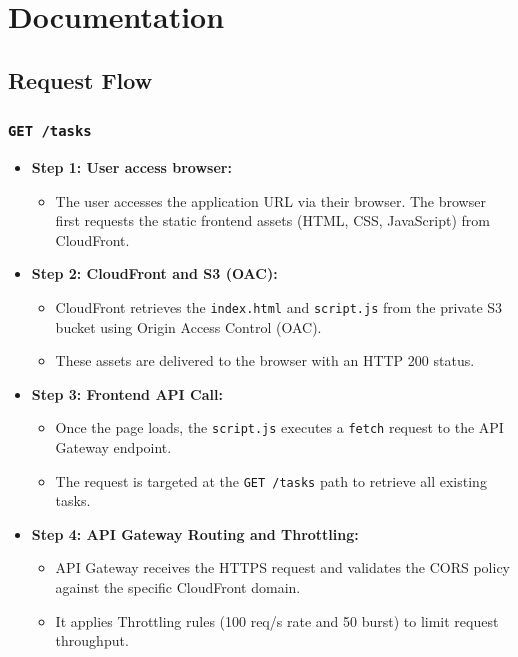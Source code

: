 \chapter{Documentation}

\section{Request Flow}

\subsection{\texttt{GET /tasks}}
\begin{itemize}
  \item \textbf{Step 1: User access browser:}
  \begin{itemize}
  \item The user accesses the application URL via their browser. The browser first requests the static frontend assets (HTML, CSS, JavaScript) from CloudFront.
  \end{itemize}
  \item \textbf{Step 2: CloudFront and S3 (OAC):}
  \begin{itemize}
    \item CloudFront retrieves the \texttt{index.html} and \texttt{script.js} from the private S3 bucket using Origin Access Control (OAC).
    \item These assets are delivered to the browser with an HTTP 200 status.
  \end{itemize}
  \item \textbf{Step 3: Frontend API Call:}
  \begin{itemize}
    \item Once the page loads, the \texttt{script.js} executes a \texttt{fetch} request to the API Gateway endpoint.
    \item The request is targeted at the \texttt{GET /tasks} path to retrieve all existing tasks.
  \end{itemize}
  \item \textbf{Step 4: API Gateway Routing and Throttling:}
  \begin{itemize}
    \item API Gateway receives the HTTPS request and validates the CORS policy against the specific CloudFront domain.
    \item It applies Throttling rules (100 req/s rate and 50 burst) to limit request throughput.
  \end{itemize}

\end{itemize}
